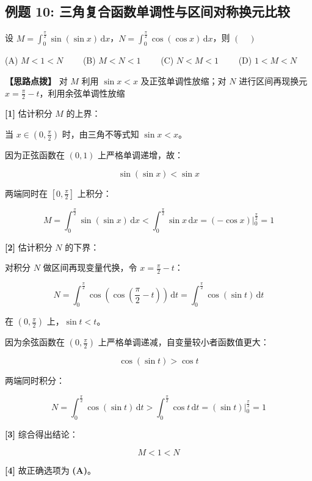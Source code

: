\documentclass[11pt,a4paper,UTF8]{ctexart}
\begin{document}
\subsection{例题 10: 三角复合函数单调性与区间对称换元比较}

设 $M = \int_0^{\frac{\pi}{2}} \sin(\sin x)\,\mathrm{d}x$，$N = \int_0^{\frac{\pi}{2}} \cos(\cos x)\,\mathrm{d}x$，则 $(\quad)$

(A) $M < 1 < N \qquad$ (B) $M < N < 1 \qquad$ (C) $N < M < 1 \qquad$ (D) $1 < M < N$

\textbf{\color{DeepPurple}【思路点拨】} 对 $M$ 利用 $\sin x < x$ 及正弦单调性放缩；对 $N$ 进行区间再现换元 $x = \frac{\pi}{2} - t$，利用余弦单调性放缩


\begin{solbox}[分步推导与答题规范]
\textbf{[1]} 估计积分 $M$ 的上界：

当 $x \in (0, \frac{\pi}{2})$ 时，由三角不等式知 $\sin x < x$。

因为正弦函数在 $(0, 1)$ 上严格单调递增，故：


\begin{equation*}
\sin(\sin x) < \sin x
\end{equation*}


两端同时在 $[0, \frac{\pi}{2}]$ 上积分：


\begin{equation*}
M = \int_0^{\frac{\pi}{2}} \sin(\sin x)\,\mathrm{d}x < \int_0^{\frac{\pi}{2}} \sin x\,\mathrm{d}x = \left. (-\cos x) \right\vert{}_0^{\frac{\pi}{2}} = 1
\end{equation*}


\textbf{[2]} 估计积分 $N$ 的下界：

对积分 $N$ 做区间再现变量代换，令 $x = \frac{\pi}{2} - t$：


\begin{equation*}
N = \int_0^{\frac{\pi}{2}} \cos\left(\cos\left(\frac{\pi}{2}-t\right)\right)\,\mathrm{d}t = \int_0^{\frac{\pi}{2}} \cos(\sin t)\,\mathrm{d}t
\end{equation*}


在 $(0, \frac{\pi}{2})$ 上，$\sin t < t$。

因为余弦函数在 $(0, \frac{\pi}{2})$ 上严格单调递减，自变量较小者函数值更大：


\begin{equation*}
\cos(\sin t) > \cos t
\end{equation*}


两端同时积分：


\begin{equation*}
N = \int_0^{\frac{\pi}{2}} \cos(\sin t)\,\mathrm{d}t > \int_0^{\frac{\pi}{2}} \cos t\,\mathrm{d}t = \left. (\sin t) \right\vert{}_0^{\frac{\pi}{2}} = 1
\end{equation*}


\textbf{[3]} 综合得出结论：


\begin{equation*}
M < 1 < N
\end{equation*}


\textbf{[4]} 故正确选项为 \textbf{(A)}。
\end{solbox}
\end{document}
